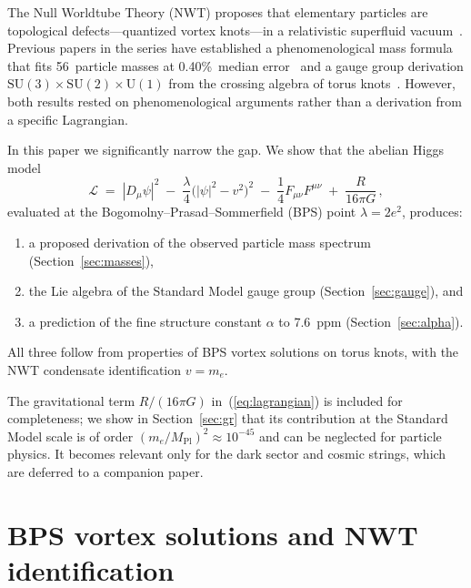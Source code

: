 \documentclass[11pt]{article}
\begin{document}
The Null Worldtube Theory (NWT) proposes that elementary particles are
topological defects---quantized vortex knots---in a relativistic
superfluid vacuum~\cite{NWT1,NWT5,NWT6}.  Previous papers in the series
have established a phenomenological mass formula that fits 56~particle
masses at 0.40\%~median error~\cite{NWT6} and a gauge group derivation
$\mathrm{SU}(3)\times\mathrm{SU}(2)\times\mathrm{U}(1)$ from the
crossing algebra of torus knots~\cite{NWT8}.  However, both results
rested on phenomenological arguments rather than a derivation from a
specific Lagrangian.

In this paper we significantly narrow the gap.  We show that the abelian Higgs model
\begin{equation}
\label{eq:lagrangian}
\mathcal{L} \;=\; |D_\mu\psi|^2
    \;-\; \frac{\lambda}{4}\bigl(|\psi|^2-v^2\bigr)^2
    \;-\; \frac{1}{4}F_{\mu\nu}F^{\mu\nu}
    \;+\; \frac{R}{16\pi G}\,,
\end{equation}
evaluated at the Bogomolny--Prasad--Sommerfield (BPS) point
$\lambda = 2e^2$, produces:
\begin{enumerate}
\item a proposed derivation of the observed particle mass spectrum (Section~\ref{sec:masses}),
\item the Lie algebra of the Standard Model gauge group
      (Section~\ref{sec:gauge}), and
\item a prediction of the fine structure constant $\alpha$ to
      7.6~ppm (Section~\ref{sec:alpha}).
\end{enumerate}
All three follow from properties of BPS vortex solutions on torus
knots, with the NWT condensate identification $v = m_e$.

The gravitational term $R/(16\pi G)$ in~(\ref{eq:lagrangian}) is
included for completeness; we show in Section~\ref{sec:gr} that its
contribution at the Standard Model scale is of order
$(m_e/M_\text{Pl})^2 \approx 10^{-45}$ and can be neglected for
particle physics.  It becomes relevant only for the dark sector and
cosmic strings, which are deferred to a companion paper.


\section{BPS vortex solutions and NWT identification}
\label{sec:bps}
\end{document}
